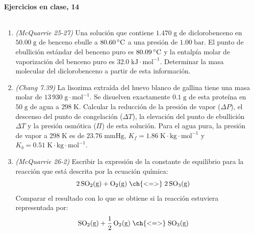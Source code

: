 \documentclass[a4paper,12pt]{article}
\begin{document}

\begin{center}
\HRule \\[0.4cm]
{ \bfseries Ejercicios en clase, 14}\\ %
\HRule \\[0.4cm]
\end{center}


\begin{enumerate}

 \item \textit{(McQuarrie 25-27)} Una soluci\'on que contiene $1.470\;\mbox{g}$ de diclorobenceno en $50.00\;\mbox{g}$ de benceno ebulle a $80.60\,\celsius$ a una presi\'on de $1.00\;\mbox{bar}$. El punto de ebullici\'on est\'andar del benceno puro es $80.09\,\celsius$ y la entalp\'ia molar de vaporizaci\'on del benceno puro es $32.0\;\mbox{kJ}\cdot\mbox{mol}^{-1}$. Determinar la masa molecular del diclorobenceno a partir de esta informaci\'on. %

 \item \textit{(Chang 7.39)} La lisozima extra\'ida del huevo blanco de gallina tiene una masa molar de $13\,930\;\mbox{g}\cdot\mbox{mol}^{-1}$. Se disuelven exactamente $0.1\;\mbox{g}$ de esta prote\'ina en $50\;\mbox{g}$ de agua a $298\;\mbox{K}$. Calcular la reducci\'on de la presi\'on de vapor ($\Delta P$), el descenso del punto de congelaci\'on ($\Delta T$), la elevaci\'on del punto de ebullici\'on $\Delta T$ y la presi\'on osm\'otica ($\Pi$) de esta soluci\'on. Para el agua pura, la presi\'on de vapor a $298\;\mbox{K}$ es de $23.76\;\mbox{mmHg}$, $K_f=1.86\;\mbox{K}\cdot\mbox{kg}\cdot\mbox{mol}^{-1}$ y $K_b=0.51\;\mbox{K}\cdot\mbox{kg}\cdot\mbox{mol}^{-1}$. %

 \item \textit{(McQuarrie 26-2)} Escribir la expresi\'on de la constante de equilibrio para la reacci\'on que est\'a descrita por la ecuaci\'on qu\'imica:
$$2\,\mbox{SO}_2\mbox{(g)}+\mbox{O}_2\mbox{(g)}\;\ch{ <=> }\;2\,\mbox{SO}_3\mbox{(g)}$$
Comparar el resultado con lo que se obtiene si la reacci\'on estuviera representada por:
$$\mbox{SO}_2\mbox{(g)}+\frac{1}{2}\,\mbox{O}_2\mbox{(g)}\;\ch{ <=> }\;\mbox{SO}_3\mbox{(g)}$$ %


\end{enumerate}
\end{document}
